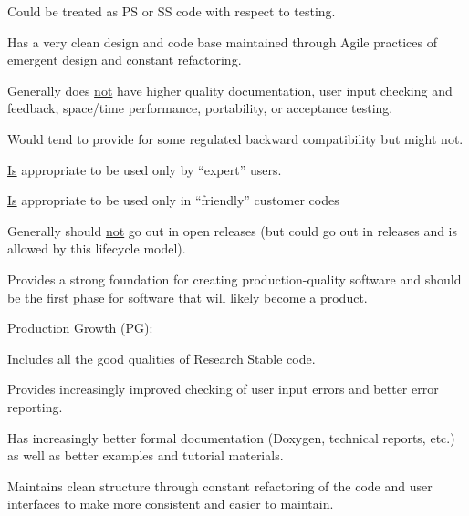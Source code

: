 \documentclass[11pt]{SANDreport}
\begin{document}
\begin{compactenum}
\begin{compactitem}
{}\item Could be treated as PS or SS code with respect to testing.

{}\item Has a very clean design and code base maintained through Agile
practices of emergent design and constant refactoring.

{}\item Generally does {}\underline{not} have higher quality
documentation, user input checking and feedback, space/time
performance, portability, or acceptance testing.

{}\item Would tend to provide for some regulated backward
compatibility but might not.

{}\item {}\underline{Is} appropriate to be used only by ``expert''
users.

{}\item {}\underline{Is} appropriate to be used only in ``friendly''
customer codes

{}\item Generally should {}\underline{not} go out in open releases
(but could go out in releases and is allowed by this lifecycle model).

{}\item Provides a strong foundation for creating production-quality
software and should be the first phase for software that will likely
become a product.

\end{compactitem}

{}\item Production Growth (PG):

\begin{compactitem}

{}\item Includes all the good qualities of Research Stable code.

{}\item Provides increasingly improved checking of user input errors
and better error reporting.

{}\item Has increasingly better formal documentation (Doxygen,
technical reports, etc.) as well as better examples and tutorial
materials.

{}\item Maintains clean structure through constant refactoring of the
code and user interfaces to make more consistent and easier to
maintain.


\end{compactitem}
\end{compactenum}
\end{document}
